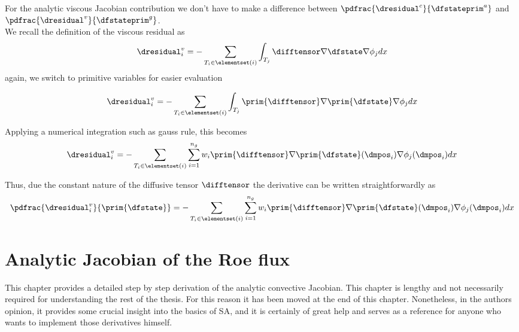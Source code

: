\documentclass[../main.tex]{subfiles}
\begin{document}
For the analytic viscous Jacobian contribution we don't have to make a difference between $\pdfrac{\dresidual^c}{\dfstateprim^a}$ and $\pdfrac{\dresidual^v}{\dfstateprim^g}$.\\
We recall the definition of the viscous residual as
\begin{align}\label{eq:derivative_viscous_residual}
\dresidual_i^v=-\sum_{T_i \in \elementset(i)} \int_{T_j} \difftensor \nabla \dfstate \nabla \phi_j dx
\end{align}
again, we switch to primitive variables for easier evaluation

\begin{align}\label{eq:derivative_viscous_residual_primitives}
\dresidual_i^v=-\sum_{T_i \in \elementset(i)} \int_{T_j} \prim{\difftensor} \nabla \prim{\dfstate} \nabla \phi_j dx
\end{align}

Applying a numerical integration such as gauss rule, this becomes
\begin{align}\label{eq:aaa1}
\dresidual_i^v=-\sum_{T_i \in \elementset(i)} \sum_{i=1}^{n_g} 
w_i \prim{\difftensor} \nabla \prim{\dfstate}(\dmpos_i) \nabla \phi_j(\dmpos_i) dx
\end{align}

Thus, due the constant nature of the diffusive tensor $\difftensor$ the derivative can be written straightforwardly as
\begin{align}\label{eq:aaa2}
\pdfrac{\dresidual_i^v}{\prim{\dfstate}}=
-\sum_{T_i \in \elementset(i)} \sum_{i=1}^{n_g} 
w_i \prim{\difftensor} \nabla \prim{\dfstate}(\dmpos_i) \nabla \phi_j(\dmpos_i) dx
\end{align}




















\section{Analytic Jacobian of the Roe flux}\label{sec:jacobian_roeflux}

This chapter provides a detailed step by step derivation of the analytic convective Jacobian. This chapter is lengthy and not necessarily required for understanding the rest of the thesis. For this reason it has been moved at the end of this chapter. Nonetheless, in the authors opinion, it provides some crucial insight into the basics of \ac{SA}, and it is certainly of great help and serves as a reference for anyone who wants to implement those derivatives himself.\\
\end{document}
